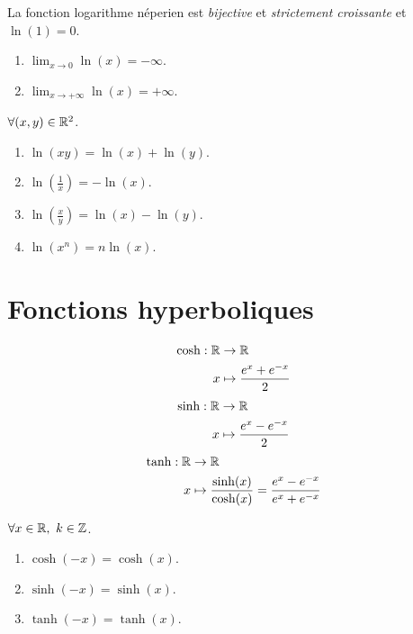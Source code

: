 \begin{proposition}
	La fonction logarithme néperien est \emph{bijective} et \emph{strictement croissante} et $\ln(1) = 0$.
    \begin{multicols}{2}
        \begin{enumerate}
            \item $\lim_{x \to 0} \ln(x) = -\infty$.
            \item $\lim_{x \to +\infty} \ln(x) = +\infty$.
        \end{enumerate}
    \end{multicols}
    \noindent $\forall (x, y) \in \mathbb{R}^2$.
    \begin{multicols}{2}
        \begin{enumerate}
            \item $\ln(xy) = \ln(x) + \ln(y)$.
            \item $\ln(\frac{1}{x}) = -\ln(x)$.
            \item $\ln(\frac{x}{y}) = \ln(x) - \ln(y)$.
            \item $\ln(x^n) = n\ln(x)$.
        \end{enumerate}
    \end{multicols}
\end{proposition}

\section{Fonctions hyperboliques}

\begin{definition}
	\begin{align*}
		\cosh : \mathbb{R} &\to \mathbb{R} \\
		         x &\mapsto \frac{e^x + e^{-x}}{2}
	\end{align*}
	\begin{align*}
		\sinh : \mathbb{R} &\to \mathbb{R} \\ 
			     x &\mapsto \frac{e^x - e^{-x}}{2}
	\end{align*}
	\begin{align*}
		\tanh : \mathbb{R} &\to \mathbb{R} \\ 
				 x &\mapsto \frac{\sinh(x)}{\cosh(x)} = \frac{e^x - e^{-x}}{e^x + e^{-x}}
	\end{align*}
\end{definition}

\begin{proposition}
	$\forall x \in \mathbb{R},\ k \in \mathbb{Z}$.
	\begin{enumerate}
		\item $\cosh(-x) = \cosh(x)$.
		\item $\sinh(-x) = \sinh(x)$.
		\item $\tanh(-x) = \tanh(x)$.
	\end{enumerate}
\end{proposition}

